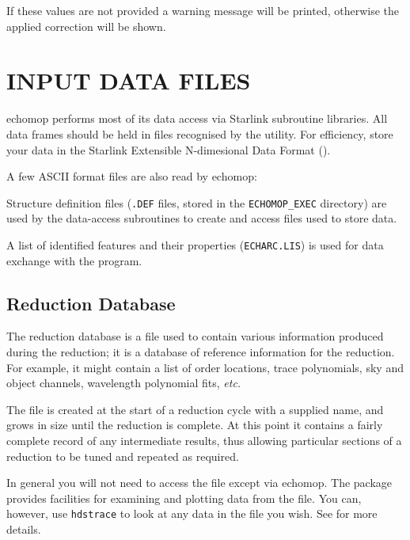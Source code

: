 If these values are not provided a warning message will be printed,
otherwise the applied correction will be shown.


\section{INPUT DATA FILES}

{\sc echomop} performs most of its data access via Starlink subroutine
libraries.
All data frames should be held in files recognised by the  utility.  For efficiency, store your data in the
Starlink Extensible N-dimesional Data Format ().

A few ASCII format files are also read by {\sc echomop}:

Structure definition files (\verb+.DEF+ files, stored in the
\verb+ECHOMOP_EXEC+ directory) are used by the data-access subroutines
to create and access files used to store data.

A list of identified features and their properties (\verb+ECHARC.LIS+)
is used for data
exchange with the  program.


\subsection{Reduction
            Database}

The reduction database is a file used to contain
various information produced during the reduction;
it is a database of reference information for the reduction.
For example, it might contain a list of order locations,
trace polynomials, sky and object channels, wavelength polynomial fits,
{\it etc.}

The file is created at the start of a reduction cycle with a supplied name,
and grows in size until the reduction is complete.
At this point it contains a fairly complete record of any intermediate
results, thus allowing particular sections of a reduction to be tuned
and repeated as required.

In general you will not need to access the file except via {\sc echomop}.
The package provides facilities for examining and plotting data from the file.
You can, however, use \verb+hdstrace+ to look at any data in the file you wish.
See  for more details.

